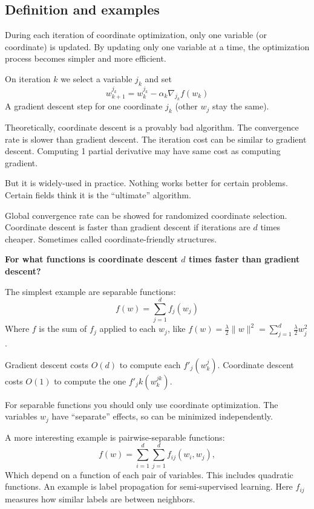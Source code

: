 \documentclass[
]{article}
\begin{document}
\subsection{Definition and examples}\label{definition-and-examples}

During each iteration of coordinate optimization, only one variable (or coordinate) is updated. By updating only one variable at a time, the optimization process becomes simpler and more efficient.

On iteration \(k\) we select a variable \(j_k\) and set
\[
w_{k+1}^{j_k} = w_k^{j_k} - \alpha_k \nabla_{j_k} f(w_k) 
\]
A gradient descent step for one coordinate \(j_k\) (other \(w_j\) stay the same).

Theoretically, coordinate descent is a provably bad algorithm. The convergence rate is slower than gradient descent. The iteration cost can be similar to gradient descent. Computing 1 partial derivative may have same cost as computing gradient.

But it is widely-used in practice. Nothing works better for certain problems. Certain fields think it is the ``ultimate'' algorithm.

Global convergence rate can be showed for randomized coordinate selection. Coordinate descent is faster than gradient descent if iterations are \(d\) times cheaper. Sometimes called coordinate-friendly structures.

\textbf{For what functions is coordinate descent \(d\) times faster than gradient descent?}

The simplest example are separable functions:
\[ 
f(w) = \sum_{j=1}^{d} f_j(w_j) 
\]
Where \(f\) is the sum of \(f_j\) applied to each \(w_j\), like \(f(w) = \frac{\lambda}{2} \|w\|^2 = \sum_{j=1}^{d} \frac{\lambda}{2} w_j^2\).

Gradient descent costs \(O(d)\) to compute each \(f'_j(w_k^j)\).
Coordinate descent costs \(O(1)\) to compute the one \(f'_jk(w_k^{jk})\).

For separable functions you should only use coordinate optimization. The variables \(w_j\) have ``separate'' effects, so can be minimized independently.

A more interesting example is pairwise-separable functions:
\[
f(w) = \sum_{i=1}^{d} \sum_{j=1}^{d} f_{ij}(w_i, w_j),
\]
Which depend on a function of each pair of variables. This includes quadratic functions. An example is label propagation for semi-supervised learning. Here \(f_{ij}\) measures how similar labels are between neighbors.
\end{document}
